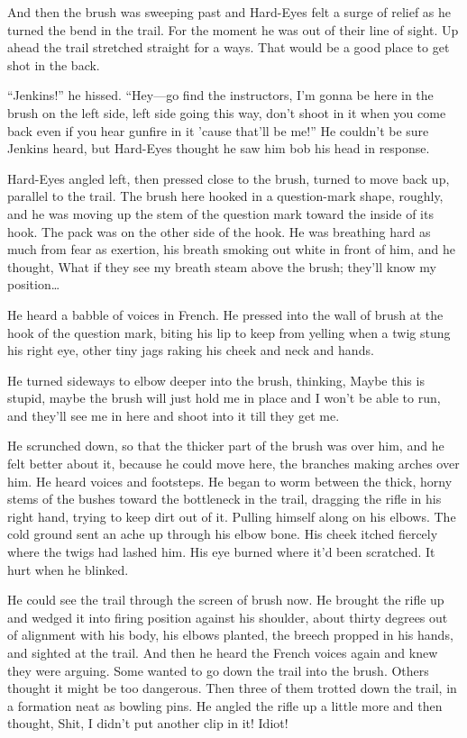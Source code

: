 And then the brush was sweeping past and Hard-Eyes felt a surge of relief as he turned the bend in the trail. For the moment he was out of their line of sight. Up ahead the trail stretched straight for a ways. That would be a good place to get shot in the back.

``Jenkins!'' he hissed. ``Hey---go find the instructors, I'm gonna be here in the brush on the left side, left side going this way, don't shoot in it when you come back even if you hear gunfire in it 'cause that'll be me!'' He couldn't be sure Jenkins heard, but Hard-Eyes thought he saw him bob his head in response.

Hard-Eyes angled left, then pressed close to the brush, turned to move back up, parallel to the trail. The brush here hooked in a question-mark shape, roughly, and he was moving up the stem of the question mark toward the inside of its hook. The pack was on the other side of the hook. He was breathing hard as much from fear as exertion, his breath smoking out white in front of him, and he thought, What if they see my breath steam above the brush; they'll know my position\ldots

He heard a babble of voices in French. He pressed into the wall of brush at the hook of the question mark, biting his lip to keep from yelling when a twig stung his right eye, other tiny jags raking his cheek and neck and hands.

He turned sideways to elbow deeper into the brush, thinking, Maybe this is stupid, maybe the brush will just hold me in place and I won't be able to run, and they'll see me in here and shoot into it till they get me.

He scrunched down, so that the thicker part of the brush was over him, and he felt better about it, because he could move here, the branches making arches over him. He heard voices and footsteps. He began to worm between the thick, horny stems of the bushes toward the bottleneck in the trail, dragging the rifle in his right hand, trying to keep dirt out of it. Pulling himself along on his elbows. The cold ground sent an ache up through his elbow bone. His cheek itched fiercely where the twigs had lashed him. His eye burned where it'd been scratched. It hurt when he blinked.

He could see the trail through the screen of brush now. He brought the rifle up and wedged it into firing position against his shoulder, about thirty degrees out of alignment with his body, his elbows planted, the breech propped in his hands, and sighted at the trail. And then he heard the French voices again and knew they were arguing. Some wanted to go down the trail into the brush. Others thought it might be too dangerous. Then three of them trotted down the trail, in a formation neat as bowling pins. He angled the rifle up a little more and then thought, Shit, I didn't put another clip in it! Idiot!

